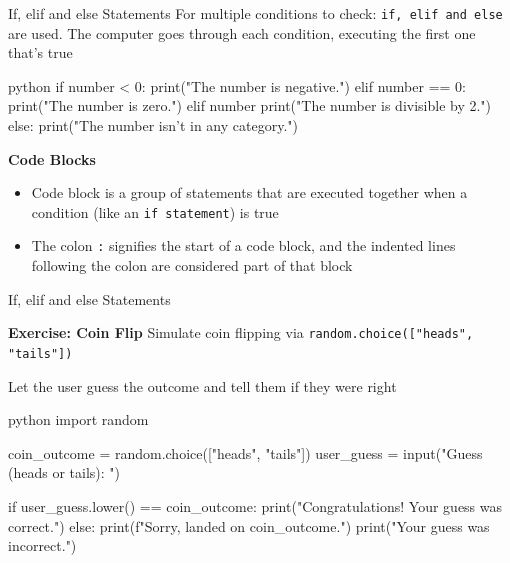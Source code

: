 \documentclass[
	11pt, 
]{beamer}
\begin{document}
\begin{frame}[fragile]{If, elif and else Statements}
For multiple conditions to check: \texttt{if, elif and else} are used. The computer goes through each condition, executing the first one that's true

\begin{mintedbox}{python}
if number < 0:
    print("The number is negative.")
elif number == 0:
    print("The number is zero.")
elif number %
    print("The number is divisible by 2.")
else:
    print("The number isn't in any category.")
\end{mintedbox}
\begin{block}{\textbf{Code Blocks}}
\begin{itemize}
    \item Code block is a group of statements that are executed together when a condition (like an \texttt{if statement}) is true
    \item The colon \texttt{:} signifies the start of a code block, and the indented lines following the colon are considered part of that block
\end{itemize}
\end{block}

\end{frame}


\begin{frame}[fragile]{If, elif and else Statements}

\begin{alertblock}{\textbf{Exercise: Coin Flip}}
Simulate coin flipping via \texttt{random.choice(["heads", "tails"])}

Let the user guess the outcome and tell them if they were right
\end{alertblock}

\pause

\begin{mintedbox}{python}
import random

coin_outcome = random.choice(["heads", "tails"])
user_guess = input("Guess (heads or tails): ")

if user_guess.lower() == coin_outcome:
    print("Congratulations! Your guess was correct.")
else:
    print(f"Sorry, landed on {coin_outcome}.")
    print("Your guess was incorrect.")
\end{mintedbox}
\end{frame}
\end{document}
